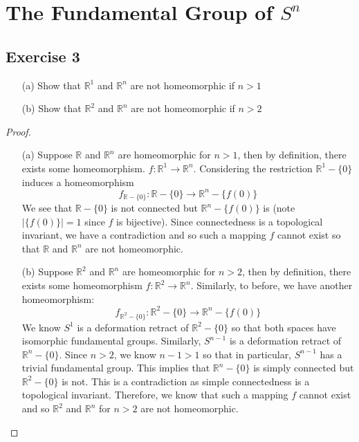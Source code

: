 \documentclass{article}
\begin{document}
\newpage

\setcounter{section}{58}
\section{The Fundamental Group of $S^n$}

\subsection*{Exercise 3}

\begin{enumerate}
	\item[(a)] Show that $\mathbb{R}^1$ and $\mathbb{R}^n$ are not homeomorphic if $n>1$
	\item[(b)] Show that $\mathbb{R}^2$ and $\mathbb{R}^n$ are not homeomorphic if $n>2$
\end{enumerate}
\begin{proof}
	\begin{enumerate}
		\item[(a)] Suppose $\mathbb{R}$ and $\mathbb{R}^n$ are homeomorphic for $n>1$, then by definition, there exists some homeomorphism.
		$f: \mathbb{R}^1 \to \mathbb{R}^n$. Considering the restriction $\mathbb{R}^1-\{0\}$ induces a homeomorphism
		\[ f_{\mathbb{R} - \{0\}}: \mathbb{R}-\{0\} \to \mathbb{R}^n - \{f(0)\} \]
		We see that $\mathbb{R}-\{0\}$ is not connected but $\mathbb{R}^n - \{f(0)\}$ is (note $|\{f(0)\}|=1$ since $f$ is bijective). Since connectedness
		is a topological invariant, we have a contradiction and so such a mapping $f$ cannot exist so that $\mathbb{R}$ and $\mathbb{R}^n$ are not
		homeomorphic.

		\item[(b)] Suppose $\mathbb{R}^2$ and $\mathbb{R}^n$ are homeomorphic for $n>2$, then by definition, there exists some homeomorphism
		$f: \mathbb{R}^2\to \mathbb{R}^n$. Similarly, to before, we have another homeomorphism:
		\[ f_{\mathbb{R}^2 - \{0\}}: \mathbb{R}^2 - \{0\} \to \mathbb{R}^n - \{f(0)\} \]
		We know $S^1$ is a deformation retract of $\mathbb{R}^2-\{0\}$ so that both spaces have isomorphic fundamental groups. Similarly, $S^{n-1}$ is
		a deformation retract of $\mathbb{R}^{n}-\{0\}$. Since $n>2$, we know $n-1>1$ so that in particular, $S^{n-1}$ has a trivial fundamental group.
		This implies that $\mathbb{R}^n-\{0\}$ is simply connected but $\mathbb{R}^{2}-\{0\}$ is not. This is a contradiction as simple connectedness is
		a topological invariant. Therefore, we know that such a mapping $f$ cannot exist and so $\mathbb{R}^2$ and $\mathbb{R}^n$ for $n>2$ are not
		homeomorphic.  
	\end{enumerate}
\end{proof}
\end{document}
